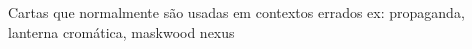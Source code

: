 Cartas que normalmente são usadas em contextos errados ex: propaganda, lanterna cromática, maskwood nexus